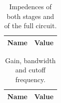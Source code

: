 \begin{table}[ht]
  \centering
  \begin{tabular}{|l|r|}
    \hline    
    {\bf Name} & {\bf Value} \\ \hline
    
  \end{tabular}
  \caption{Impedences of both stages and of the full circuit.}
  \label{tab:2}
\end{table}



\begin{table}[ht]
  \centering
  \begin{tabular}{|l|r|}
    \hline    
    {\bf Name} & {\bf Value} \\ \hline
    
  \end{tabular}
  \caption{Gain, bandwidth and cutoff frequency.}
  \label{tab:3}
\end{table}













